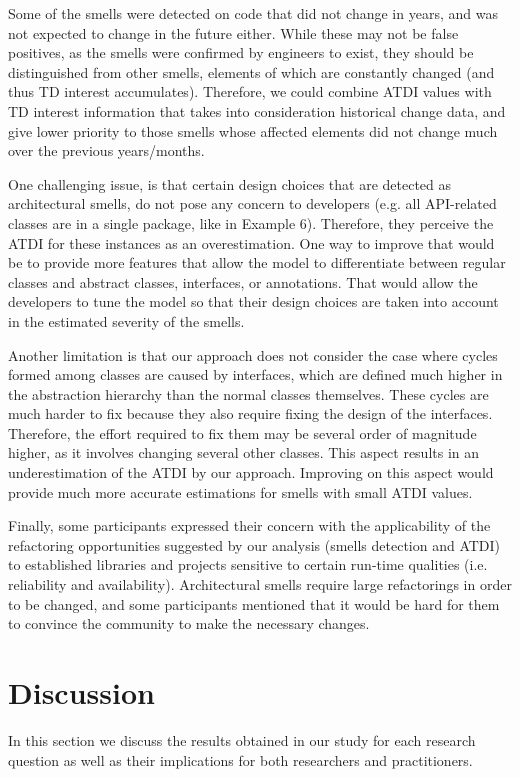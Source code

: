 Some of the smells were detected on code that did not change in years, and was not expected to change in the future either. 
While these may not be false positives, as the smells were confirmed by engineers to exist, they should be distinguished from other smells, elements of which are constantly changed (and thus TD interest accumulates).
Therefore, we could combine ATDI values with TD interest information that takes into consideration historical change data, and give lower priority to those smells whose affected elements did not change much over the previous years/months.

One challenging issue, is that certain design choices that are detected as architectural smells, do not pose any concern to developers (e.g. all API-related classes are in a single package, like in Example 6).
Therefore, they perceive the ATDI for these instances as an overestimation.
One way to improve that would be to provide more features that allow the model to differentiate between regular classes and abstract classes, interfaces, or annotations. That would allow the developers to tune the model so that their design choices are taken into account in the estimated severity of the smells.

Another limitation is that our approach does not consider the case where cycles formed among classes are caused by interfaces, which are defined much higher in the abstraction hierarchy than the normal classes themselves.
These cycles are much harder to fix because they also require fixing the design of the interfaces. Therefore, the effort required to fix them may be several order of magnitude higher, as it involves changing several other classes.
This aspect results in an underestimation of the ATDI by our approach.
Improving on this aspect would provide much more accurate estimations for smells with small ATDI values.

Finally, some participants expressed their concern with the applicability of the refactoring opportunities suggested by our analysis (smells detection and ATDI) to established libraries and projects sensitive to certain run-time qualities (i.e. reliability and availability).
Architectural smells require large refactorings in order to be changed, and some participants mentioned that it would be hard for them to convince the community to make the necessary changes.


\section{Discussion}\label{c6:sec:discussion}
In this section we discuss the results obtained in our study for each research question as well as their implications for both researchers and practitioners.

